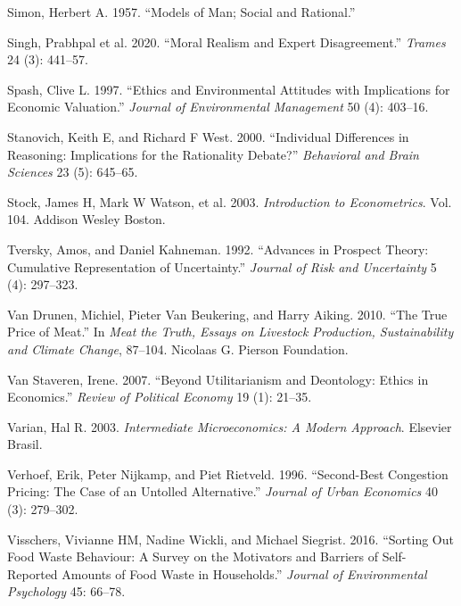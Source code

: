 \documentclass[
]{book}
\newlength{\cslhangindent}
\newlength{\cslentryspacingunit} %
\newenvironment{CSLReferences}[2] %
 {%
  \setlength{\parindent}{0pt}
  \ifodd #1
  \let\oldpar\par
  \def\par{\hangindent=\cslhangindent\oldpar}
  \fi
  \setlength{\parskip}{#2\cslentryspacingunit}
 }%
 {}
\begin{document}
\begin{CSLReferences}{1}{0}
\leavevmode{}%
Simon, Herbert A. 1957. {``Models of Man; Social and Rational.''}

\leavevmode{}%
Singh, Prabhpal et al. 2020. {``Moral Realism and Expert Disagreement.''} \emph{Trames} 24 (3): 441--57.

\leavevmode{}%
Spash, Clive L. 1997. {``Ethics and Environmental Attitudes with Implications for Economic Valuation.''} \emph{Journal of Environmental Management} 50 (4): 403--16.

\leavevmode{}%
Stanovich, Keith E, and Richard F West. 2000. {``Individual Differences in Reasoning: Implications for the Rationality Debate?''} \emph{Behavioral and Brain Sciences} 23 (5): 645--65.

\leavevmode{}%
Stock, James H, Mark W Watson, et al. 2003. \emph{Introduction to Econometrics}. Vol. 104. Addison Wesley Boston.

\leavevmode{}%
Tversky, Amos, and Daniel Kahneman. 1992. {``Advances in Prospect Theory: Cumulative Representation of Uncertainty.''} \emph{Journal of Risk and Uncertainty} 5 (4): 297--323.

\leavevmode{}%
Van Drunen, Michiel, Pieter Van Beukering, and Harry Aiking. 2010. {``The True Price of Meat.''} In \emph{Meat the Truth, Essays on Livestock Production, Sustainability and Climate Change}, 87--104. Nicolaas G. Pierson Foundation.

\leavevmode{}%
Van Staveren, Irene. 2007. {``Beyond Utilitarianism and Deontology: Ethics in Economics.''} \emph{Review of Political Economy} 19 (1): 21--35.

\leavevmode{}%
Varian, Hal R. 2003. \emph{Intermediate Microeconomics: A Modern Approach}. Elsevier Brasil.

\leavevmode{}%
Verhoef, Erik, Peter Nijkamp, and Piet Rietveld. 1996. {``Second-Best Congestion Pricing: The Case of an Untolled Alternative.''} \emph{Journal of Urban Economics} 40 (3): 279--302.

\leavevmode{}%
Visschers, Vivianne HM, Nadine Wickli, and Michael Siegrist. 2016. {``Sorting Out Food Waste Behaviour: A Survey on the Motivators and Barriers of Self-Reported Amounts of Food Waste in Households.''} \emph{Journal of Environmental Psychology} 45: 66--78.


\end{CSLReferences}
\end{document}
